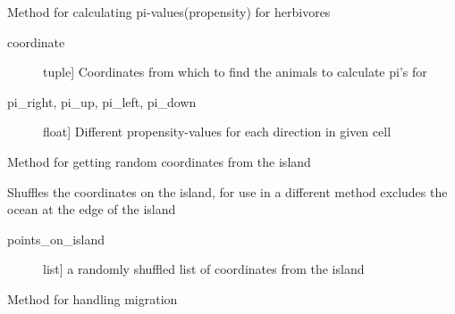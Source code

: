 \documentclass[a4paper,10pt,english]{sphinxmanual}
\begin{document}
\begin{fulllineitems}
\begin{fulllineitems}
\end{fulllineitems}


\begin{fulllineitems}
\label{\detokenize{island:biosim.island.Island.get_pi_values_herbivores}}
Method for calculating pi-values(propensity) for herbivores
\begin{description}
\item[{coordinate}] \leavevmode{[}tuple{]}
Coordinates  from which to find the animals to calculate pi's for

\end{description}
\begin{description}
\item[{pi\_right, pi\_up, pi\_left, pi\_down}] \leavevmode{[}float{]}
Different propensity-values for each direction in given cell

\end{description}

\end{fulllineitems}


\begin{fulllineitems}
\label{\detokenize{island:biosim.island.Island.get_random_coordinates}}
Method for getting random coordinates from the island

Shuffles the coordinates on the island, for use in a different method
excludes the ocean at the edge of the island
\begin{description}
\item[{points\_on\_island}] \leavevmode{[}list{]}
a randomly shuffled list of coordinates from the island

\end{description}

\end{fulllineitems}


\begin{fulllineitems}
\label{\detokenize{island:biosim.island.Island.migration}}
Method for handling migration


\end{fulllineitems}
\end{fulllineitems}
\end{document}
